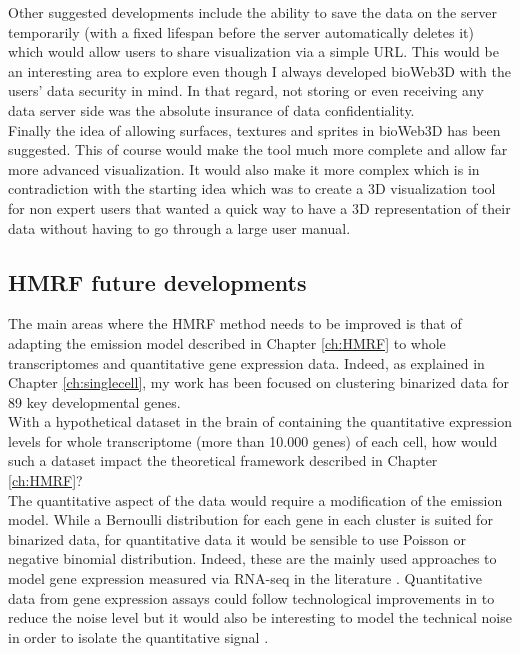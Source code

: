    Other suggested developments include the ability to save the data on the server temporarily (with a fixed lifespan before the server automatically deletes it) which would allow users to share visualization via a simple URL. This would be an interesting area to explore even though I always developed bioWeb3D with the users' data security in mind. In that regard, not storing or even receiving any data server side was the absolute insurance of data confidentiality.\\
   
   Finally the idea of allowing surfaces, textures and sprites in bioWeb3D has been suggested. This of course would make the tool much more complete and allow far more advanced visualization. It would also make it more complex which is in contradiction with the starting idea which was to create a 3D visualization tool for non expert users that wanted a quick way to have a 3D representation of their data without having to go through a large user manual.
  
  
  \subsection{HMRF future developments}
  The main areas where the HMRF method needs to be improved is that of adapting the emission model described in Chapter \ref{ch:HMRF} to whole transcriptomes and quantitative gene expression data. Indeed, as explained in Chapter \ref{ch:singlecell}, my work has been focused on clustering binarized data for 89 key developmental genes.\\
  
  With a hypothetical dataset in the brain of \platy{} containing the quantitative expression levels for whole transcriptome (more than 10.000 genes) of each cell, how would such a dataset impact the theoretical framework described in Chapter \ref{ch:HMRF}?\\
  
  The quantitative aspect of the data would require a modification of the emission model. While a Bernoulli distribution for each gene in each cluster is suited for binarized data, for quantitative data it would be sensible to use Poisson or negative binomial distribution. Indeed, these are the mainly used approaches to model gene expression measured via RNA-seq in the literature \citep{marioni08,anders10}.  Quantitative data from gene expression assays could follow technological improvements in to reduce the noise level but it would also be interesting to model the technical noise in order to isolate the quantitative signal \citep{brennecke13}.\\
  

